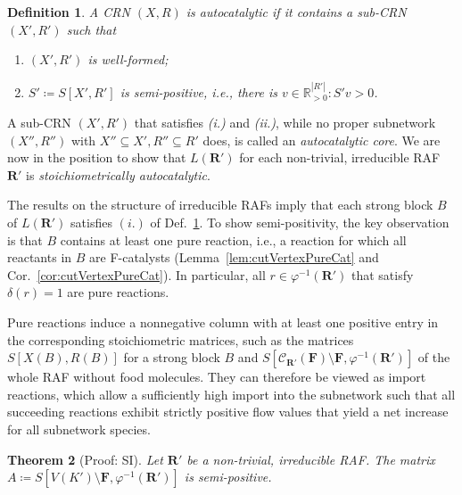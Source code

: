 \documentclass[pdflatex]{sn-jnl}
\theoremstyle{thmstyleone}%
\newtheorem{theorem}{Theorem}%
\theoremstyle{examplesty}%
\theoremstyle{thmstylethree}%
\newtheorem{definition}[theorem]{Definition}%
\newcommand{\king}{K}
\newcommand{\lord}{L}
\newcommand{\food}{\ensuremath{\mathbf{F}}}
\newcommand{\SM}{S}
\newcommand{\closure}[2]{\mathscr{C}_{#1}(#2)}
\newcommand{\RAF}[0]{\mathbf{R}'}
\begin{document}
\vspace{6pt}
\begin{definition}\label{def:autSubRN}
  A CRN $(X,R)$ is \emph{autocatalytic} if it contains a sub-CRN $(X',R')$
  such that
\begin{enumerate}
 \item[(i)]  $(X',R')$ is  well-formed;
 \item[(ii)]  $\SM'\coloneqq \SM[X',R']$ is semi-positive, i.e., there is $v\in \mathbb{R}_{>0}^{|R'|}: \SM'v>0$.
\end{enumerate}
\end{definition}
\vspace{6pt}

A sub-CRN $(X',R')$ that satisfies \textit{(i.)} and \textit{(ii.)}, while
no proper subnetwork $(X'',R'')$ with $X''\subseteq X', R''\subseteq R'$
does, is called an \emph{autocatalytic core}. We are now in the position to
show that $\lord(\RAF)$ for each non-trivial, irreducible RAF $\RAF$ is
\emph{stoichiometrically autocatalytic}.

The results on the structure of irreducible RAFs imply that each strong
block $B$ of $\lord(\RAF)$ satisfies $(i.)$ of Def.~\ref{def:autSubRN}. To
show semi-positivity, the key observation is that $B$ contains at least one
pure reaction, i.e., a reaction for which all reactants in $B$ are
F-catalysts (Lemma~\ref{lem:cutVertexPureCat} and
Cor.~\ref{cor:cutVertexPureCat}). In particular, all $r \in
\varphi^{-1}(\RAF)$ that satisfy $\delta(r)=1$ are pure reactions.

Pure reactions induce a nonnegative column with at least one positive entry
in the corresponding stoichiometric matrices, such as the matrices
$\SM[X(B), R(B)]$ for a strong block $B$ and
$\SM[\closure{\RAF}{\food}\setminus \food, \varphi^{-1}(\RAF)]$ of the
whole RAF without food molecules. They can therefore be viewed as import
reactions, which allow a sufficiently high import into the subnetwork such
that all succeeding reactions exhibit strictly positive flow values that
yield a net increase for all subnetwork species.
\vspace{6pt}
\begin{theorem}[Proof: SI]\label{thm:NonFoodSemipositiv}
  Let $\RAF$ be a non-trivial, irreducible RAF. The matrix $A\coloneqq
  \SM[V(\king')\setminus \food, \varphi^{-1} (\RAF)]$ is semi-positive.
\end{theorem}
\vspace{6pt}
\end{document}
